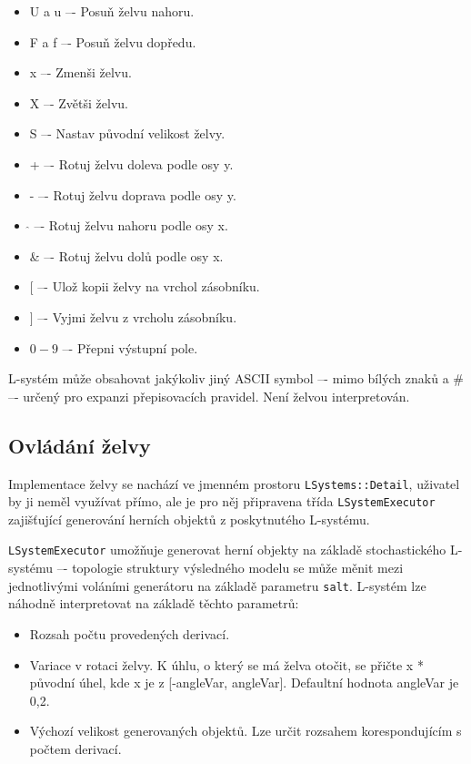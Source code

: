 \documentclass[thesis=M,czech]{FITthesis}[2019/12/23]
\begin{document}
\begin{itemize}
\item U a u –- Posuň želvu nahoru.
\item F a f –- Posuň želvu dopředu.
\item x –- Zmenši želvu.
\item X –- Zvětši želvu.
\item S –- Nastav původní velikost želvy.
\item + –- Rotuj želvu doleva podle osy y.
\item - –- Rotuj želvu doprava podle osy y.
\item $\hat{}$ –- Rotuj želvu nahoru podle osy x.
\item \& –- Rotuj želvu dolů podle osy x.
\item $[$ –- Ulož kopii želvy na vrchol zásobníku.
\item $]$ –- Vyjmi želvu z vrcholu zásobníku.
\item $0-9$ –- Přepni výstupní pole.
\end{itemize}

L-systém může obsahovat jakýkoliv jiný ASCII symbol –- mimo bílých znaků a \# –- určený pro expanzi přepisovacích pravidel. Není želvou interpretován.

\subsection{Ovládání želvy}
Implementace želvy se nachází ve jmenném prostoru \texttt{LSystems::Detail}, uživatel by ji neměl využívat přímo, ale je pro něj připravena třída \texttt{LSystemExecutor} zajišťující generování herních objektů z poskytnutého L-systému.

\texttt{LSystemExecutor} umožňuje generovat herní objekty na základě stochastického L-systému –- topologie struktury výsledného modelu se může měnit mezi jednotlivými voláními generátoru na základě parametru \texttt{salt}. L-systém lze náhodně interpretovat na základě těchto parametrů:

\begin{itemize}
\item Rozsah počtu provedených derivací.
\item Variace v rotaci želvy. K úhlu, o který se má želva otočit, se přičte x * původní úhel, kde x je z [-angleVar, angleVar]. Defaultní hodnota angleVar je 0,2.
\item Výchozí velikost generovaných objektů. Lze určit rozsahem korespondujícím s počtem derivací.
\end{itemize}
\end{document}
